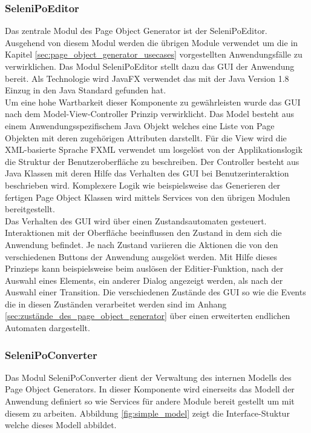 \subsubsection{SeleniPoEditor}


Das zentrale Modul des Page Object Generator ist der SeleniPoEditor.
Ausgehend von diesem Modul werden die übrigen Module verwendet um die in Kapitel \ref{sec:page_object_generator_usecases} vorgestellten Anwendungsfälle zu verwirklichen.
Das Modul SeleniPoEditor stellt dazu das GUI der Anwendung bereit.
Als Technologie wird JavaFX verwendet das mit der Java Version 1.8 Einzug in den Java Standard gefunden hat. \\
Um eine hohe Wartbarkeit dieser Komponente zu gewährleisten wurde das GUI nach dem Model-View-Controller Prinzip verwirklicht.
Das Model besteht aus einem Anwendungsspezifischem Java Objekt welches eine Liste von Page Objekten mit deren zugehörigen Attributen darstellt.
Für die View wird die XML-basierte Sprache FXML verwendet um losgelöst von der Applikationslogik die Struktur der Benutzeroberfläche zu beschreiben.
Der Controller besteht aus Java Klassen mit deren Hilfe das Verhalten des GUI bei Benutzerinteraktion beschrieben wird.
Komplexere Logik wie beispielsweise das Generieren der fertigen Page Object Klassen wird mittels Services von den übrigen Modulen bereitgestellt.\\
Das Verhalten des GUI wird über einen Zustandsautomaten gesteuert.
Interaktionen mit der Oberfläche beeinflussen den Zustand in dem sich die Anwendung befindet. Je nach Zustand variieren die Aktionen die von den verschiedenen Buttons der Anwendung ausgelöst werden.
Mit Hilfe dieses Prinzieps kann beispielsweise beim auslösen der Editier-Funktion, nach der Auswahl eines Elements, ein anderer Dialog angezeigt werden, als nach der Auswahl einer Transition.
Die verschiedenen Zustände des GUI so wie die Events die in diesen Zuständen verarbeitet werden sind im Anhang \ref{sec:zustände_des_page_object_generator} über einen erweiterten endlichen Automaten dargestellt.

\subsubsection{SeleniPoConverter}
Das Modul SeleniPoConverter dient der Verwaltung des internen Modells des Page Object Generators. In dieser Komponente wird einerseits das Modell der Anwendung definiert so wie Services für andere Module bereit gestellt um mit diesem zu arbeiten.
Abbildung \ref{fig:simple_model} zeigt die Interface-Stuktur welche dieses Modell abbildet.

